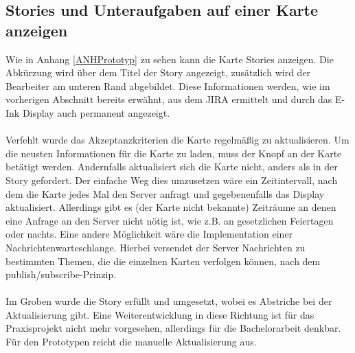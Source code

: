 \documentclass[12pt,titlepage]{scrartcl}
\begin{document}
			\subsection{Stories und Unteraufgaben auf einer Karte anzeigen}
			Wie in Anhang \ref{ANHPrototyp} zu sehen kann die Karte Stories anzeigen. Die Abkürzung wird über dem Titel der Story angezeigt, zusätzlich wird der Bearbeiter am unteren Rand abgebildet. Diese Informationen werden, wie im vorherigen Abschnitt bereits erwähnt, aus dem JIRA ermittelt und durch das E-Ink Display auch permanent angezeigt. \\ \\
			Verfehlt wurde das Akzeptanzkriterien die Karte regelmäßig zu aktualisieren. Um die neusten Informationen für die Karte zu laden, muss der Knopf an der Karte betätigt werden. Andernfalls aktualisiert sich die Karte nicht, anders als in der Story gefordert. Der einfache Weg dies umzusetzen wäre ein Zeitintervall, nach dem die Karte jedes Mal den Server anfragt und gegebenenfalls das Display aktualisiert. Allerdings gibt es (der Karte nicht bekannte) Zeiträume an denen eine Anfrage an den Server nicht nötig ist, wie z.B. an gesetzlichen Feiertagen oder nachts. Eine andere Möglichkeit wäre die Implementation einer Nachrichtenwarteschlange. Hierbei versendet der Server Nachrichten zu bestimmten Themen, die die einzelnen Karten verfolgen können, nach dem publish/subscribe-Prinzip. \\ \\
			Im Groben wurde die Story erfüllt und umgesetzt, wobei es Abstriche bei der Aktualisierung gibt. Eine Weiterentwicklung in diese Richtung ist für das Praxisprojekt nicht mehr vorgesehen, allerdings für die Bachelorarbeit denkbar. Für den Prototypen reicht die manuelle Aktualisierung aus.
\end{document}
